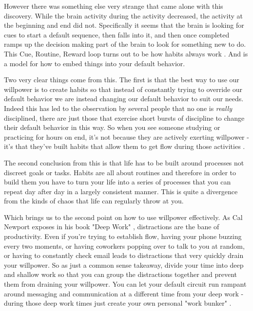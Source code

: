 \documentclass[11pt,a5paper]{book}
\begin{document}
However there was something else very strange that came alone with this discovery. While the brain activity during the activity decreased, the activity at the beginning and end did not. Specifically it seems that the brain is looking for cues to start a default sequence, then falls into it, and then once completed ramps up the decision making part of the brain to look for something new to do. This Cue, Routine, Reward loop turns out to be how habits always work \cite{duhigg}. And is a model for how to embed things into your default behavior. 
\newline

Two very clear things come from this. The first is that the best way to use our willpower is to create habits so that instead of constantly trying to override our default behavior we are instead changing our default behavior to suit our needs. Indeed this has led to the observation by several people that no one is \textit{really} disciplined, there are just those that exercise short bursts of discipline to change their default behavior in this way. So when you see someone studying or practicing for hours on end, it's not because they are actively exerting willpower - it's that they've built habits that allow them to get flow during those activities \cite{keller}. 
\newline

The second conclusion from this is that life has to be built around processes not discreet goals or tasks. Habits are all about routines and therefore in order to build them you have to turn your life into a series of processes that you can repeat day after day in a largely consistent manner. This is quite a divergence from the kinds of chaos that life can regularly throw at you.
\newline

Which brings us to the second point on how to use willpower effectively. As Cal Newport exposes in his book "Deep Work" \cite{newport}, distractions are the bane of productivity. Even if you're trying to establish flow, having your phone buzzing every two moments, or having coworkers popping over to talk to you at random, or having to constantly check email leads to distractions that very quickly drain your willpower. So as just a common sense takeaway, divide your time into deep and shallow work so that you can group the distractions together and prevent them from draining your willpower. You can let your default circuit run rampant around messaging and communication at a different time from your deep work - during those deep work times just create your own personal "work bunker" \cite{newport}.
\newline
\end{document}
